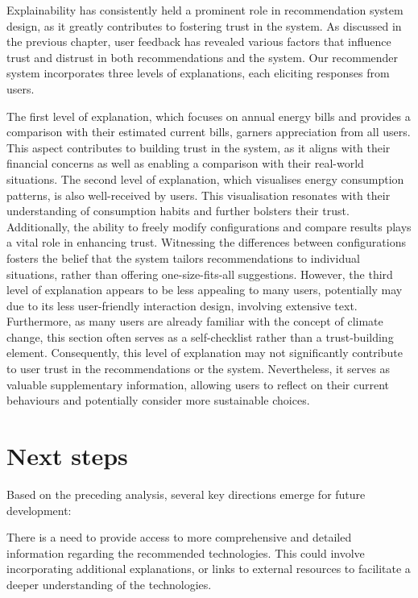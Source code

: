 Explainability has consistently held a prominent role in recommendation system design, as it greatly contributes to fostering trust in the system. 
As discussed in the previous chapter, user feedback has revealed various factors that influence trust and distrust in both recommendations and the system. 
Our recommender system incorporates three levels of explanations, each eliciting responses from users. 

The first level of explanation, which focuses on annual energy bills and provides a comparison with their estimated current bills, garners appreciation from all users. 
This aspect contributes to building trust in the system, as it aligns with their financial concerns as well as enabling a comparison with their real-world situations.
The second level of explanation, which visualises energy consumption patterns, is also well-received by users. 
This visualisation resonates with their understanding of consumption habits and further bolsters their trust.
Additionally, the ability to freely modify configurations and compare results plays a vital role in enhancing trust. 
Witnessing the differences between configurations fosters the belief that the system tailors recommendations to individual situations, rather than offering one-size-fits-all suggestions.
However, the third level of explanation appears to be less appealing to many users, potentially may due to its less user-friendly interaction design, involving extensive text. 
Furthermore, as many users are already familiar with the concept of climate change, this section often serves as a self-checklist rather than a trust-building element.
Consequently, this level of explanation may not significantly contribute to user trust in the recommendations or the system. 
Nevertheless, it serves as valuable supplementary information, allowing users to reflect on their current behaviours and potentially consider more sustainable choices.


\section{Next steps}

Based on the preceding analysis, several key directions emerge for future development:

There is a need to provide access to more comprehensive and detailed information regarding the recommended technologies. 
This could involve incorporating additional explanations, or links to external resources to facilitate a deeper understanding of the technologies.

